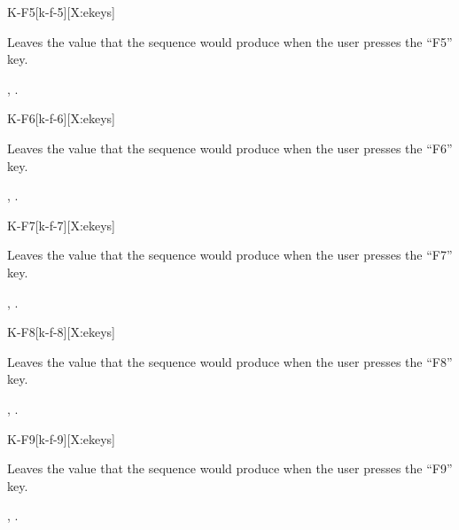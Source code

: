 \begin{worddef}{}{K-F5}[k-f-5][X:ekeys]
\item {}

	Leaves the value  that the sequence 
	 would produce when the user presses the
	``F5'' key.

\see {},
	.
\end{worddef}


\begin{worddef}{}{K-F6}[k-f-6][X:ekeys]
\item {}

	Leaves the value  that the sequence 
	 would produce when the user presses the
	``F6'' key.

\see {},
	.
\end{worddef}


\begin{worddef}{}{K-F7}[k-f-7][X:ekeys]
\item {}

	Leaves the value  that the sequence 
	 would produce when the user presses the
	``F7'' key.

\see {},
	.
\end{worddef}


\begin{worddef}{}{K-F8}[k-f-8][X:ekeys]
\item {}

	Leaves the value  that the sequence 
	 would produce when the user presses the
	``F8'' key.

\see {},
	.
\end{worddef}


\begin{worddef}{}{K-F9}[k-f-9][X:ekeys]
\item {}

	Leaves the value  that the sequence 
	 would produce when the user presses the
	``F9'' key.

\see {},
	.
\end{worddef}


